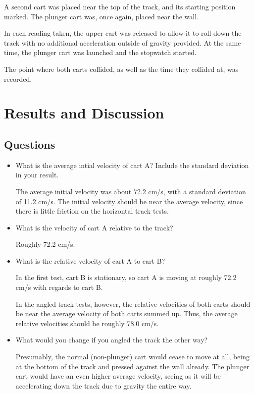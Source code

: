 \documentclass{article}
\begin{document}
A second cart was placed near the top of the track, and its starting position marked.
The plunger cart was, once again, placed near the wall.

In each reading taken, the upper cart was released to allow it to roll down the track with no additional acceleration outside of gravity provided.
At the same time, the plunger cart was launched and the stopwatch started.

The point where both carts collided, as well as the time they collided at, was recorded.

\section{Results and Discussion}



\subsection{Questions}

\begin{itemize}

\item What is the average intial velocity of cart A? Include the standard deviation in your result.

The average initial velocity was about 72.2 cm/s, with a standard deviation of 11.2 cm/s.
The initial velocity should be near the average velocity, since there is little friction on the horizontal track tests.

\item What is the velocity of cart A relative to the track?

Roughly 72.2 cm/s.

\item What is the relative velocity of cart A to cart B?

In the first test, cart B is stationary, so cart A is moving at roughly 72.2 cm/s with regards to cart B.

In the angled track tests, however, the relative velocities of both carts should be near the average velocity of both carts summed up.
Thus, the average relative velocities should be roughly 78.0 cm/s.

\item What would you change if you angled the track the other way?

Presumably, the normal (non-plunger) cart would cease to move at all, being at the bottom of the track and pressed against the wall already.
The plunger cart would have an even higher average velocity, seeing as it will be accelerating down the track due to gravity the entire way.

\end{itemize}
\end{document}
